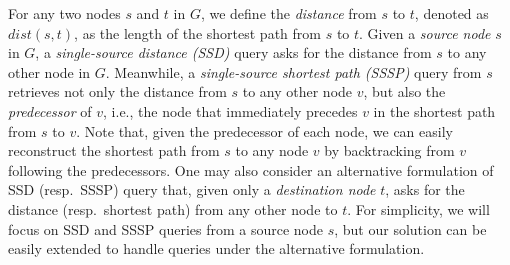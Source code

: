 \documentclass{sig-alternate}
\def\figcapup{\vspace{-2mm}}
\def\figcapdown{\vspace{-3mm}}
\def\d{dist}
\begin{document}
\begin{sloppy}
For any two nodes $s$ and $t$ in $G$, we define the {\em distance} from $s$ to $t$, denoted as $\d(s, t)$, as the length of the shortest path from $s$ to $t$. Given a {\em source node} $s$ in $G$, a {\em single-source distance (SSD)} query asks for the distance from $s$ to any other node in $G$. Meanwhile, a {\em single-source shortest path (SSSP)} query from $s$ retrieves not only the distance from $s$ to any other node $v$, but also the {\em predecessor} of $v$, i.e., the node that immediately precedes $v$ in the shortest path from $s$ to $v$. Note that, given the predecessor of each node, we can easily reconstruct the shortest path from $s$ to any node $v$ by backtracking from $v$ following the predecessors. One may also consider an alternative formulation of SSD (resp.\ SSSP) query that, given only a {\em destination node} $t$, asks for the distance (resp.\ shortest path) from any other node to $t$. For simplicity, we will focus on SSD and SSSP queries from a source node $s$, but our solution can be easily extended to handle queries under the alternative formulation.




\end{sloppy}
\end{document}
